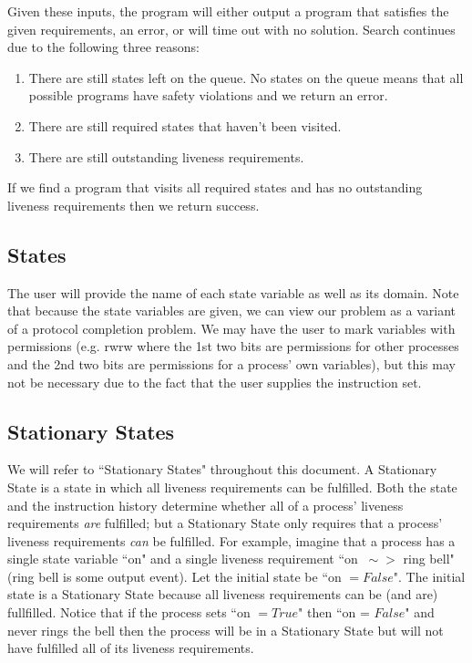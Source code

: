 \documentclass[12pt]{article}
\begin{document}
Given these inputs, the program will either output a program that satisfies the given requirements, an error, or will time out with no solution.  Search continues due to the following three reasons:
\begin{enumerate}
	\item There are still states left on the queue.  No states on the queue means that all possible programs have safety violations and we return an error.  
	\item There are still required states that haven't been visited.  
	\item There are still outstanding liveness requirements.  
\end{enumerate}

If we find a program that visits all required states and has no outstanding liveness requirements then we return success.  

\subsection{States}
The user will provide the name of each state variable as well as its domain.  Note that because the state variables are given, we can view our problem as a variant of a protocol completion problem.  We may have the user to mark variables with permissions (e.g. rwrw where the 1st two bits are permissions for other processes and the 2nd two bits are permissions for a process' own variables), but this may not be necessary due to the fact that the user supplies the instruction set.  

\subsection{Stationary States}
We will refer to ``Stationary States" throughout this document.  A Stationary State is a state in which all liveness requirements can be fulfilled.  Both the state and the instruction history determine whether all of a process' liveness requirements \textit{are} fulfilled; but a Stationary State only requires that a process' liveness requirements \textit{can} be fulfilled.  For example, imagine that a process has a single state variable ``on" and a single liveness requirement ``on $~\sim>$ ring bell" (ring bell is some output event).  Let the initial state be ``on $=False$".  The initial state is a Stationary State because all liveness requirements can be (and are) fullfilled.  Notice that if the process sets ``on $=True$" then ``on = $False$" and never rings the bell then the process will be in a Stationary State but will not have fulfilled all of its liveness requirements.  \\
\end{document}

